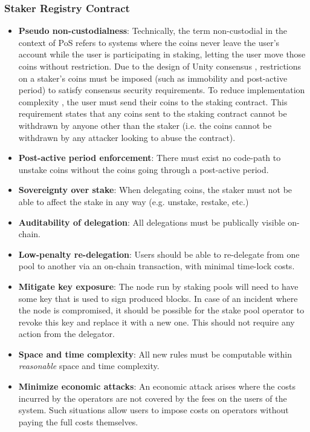 \subsubsection{Staker Registry Contract}
\begin{itemize}
    \item \textbf{Pseudo non-custodialness}: Technically, the term non-custodial in the context of PoS refers to systems where the coins never leave the user's account while the user is participating in staking, letting the user move those coins without restriction. Due to the design of Unity consensus \cite{WZS19}, restrictions on a staker's coins must be imposed (such as immobility and post-active period) to satisfy consensus security requirements. To reduce implementation complexity \cite{ZZW19}, the user must send their coins to the staking contract. This requirement states that any coins sent to the staking contract cannot be withdrawn by anyone other than the staker (i.e. the coins cannot be withdrawn by any attacker looking to abuse the contract).
    \item \textbf{Post-active period enforcement}: There must exist no code-path to unstake coins without the coins going through a post-active period. 
    \item \textbf{Sovereignty over stake}: When delegating coins, the staker must not be able to affect the stake in any way (e.g. unstake, restake, etc.) 
    \item \textbf{Auditability of delegation}: All delegations must be publically visible on-chain. 
    \item \textbf{Low-penalty re-delegation}: Users should be able to re-delegate from one pool to another via an on-chain transaction, with minimal time-lock costs.
    \item \textbf{Mitigate key exposure}: The node run by staking pools will need to have some key that is used to sign produced blocks. In case of an incident where the node is compromised, it should be possible for the stake pool operator to revoke this key and replace it with a new one. This should not require any action from the delegator. 
    \item \textbf{Space and time complexity}: All new rules must be computable within \textit{reasonable} space and time complexity. 
    \item \textbf{Minimize economic attacks}: An economic attack arises where the costs incurred by the operators are not covered by the fees on the users of the system. Such situations allow users to impose costs on operators without paying the full costs themselves.
\end{itemize}

